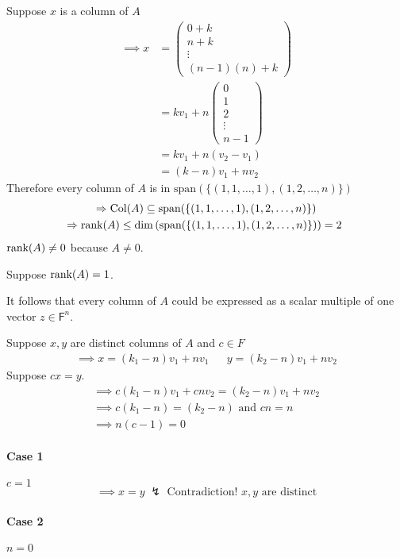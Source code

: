 Suppose $x$ is a column of $A$
\begin{align}
\implies x &= \begin{pmatrix}
0 + k\\
n + k\\
\vdots\\
(n-1)(n)+k
\end{pmatrix}\\
&= kv_1 + n\begin{pmatrix}
0\\
1\\
2\\
\vdots\\
n-1
\end{pmatrix}\\
&= kv_1 + n(v_2-v_1)\\
&= (k-n)v_1 + nv_2
\end{align}
Therefore every column of $A$ is in
$\text{span}(\{(1,1,\dotsc,1),(1,2,\dotsc,n)\})$ 
\begin{gather}
\Rightarrow \text{Col}(A) \subseteq
\text{span}(\{(1,1,\dotsc,1),(1,2,\dotsc,n)\})\\
\Rightarrow \text{rank}({A}) \leq
\dim{\left(\text{span}(\{(1,1,\dotsc,1),(1,2,\dotsc,n)\})\right)}=2\
\end{gather}
$\text{rank}({A})\neq 0$ because $A\neq 0$.

Suppose $\text{rank}({A})=1$.

It follows that every column of $A$ could be expressed as a scalar
multiple of one vector $z \in \mathsf{F}^n.$

Suppose $x,y$ are distinct columns of $A$ and $c \in F$  
\begin{align}
\implies x = (k_1 -n)v_1 + nv_1 & & y = (k_2 -n)v_1 + nv_2
\end{align}
Suppose $cx= y$.
\begin{gather}
\implies c(k_1-n)v_1 + cnv_2  = (k_2 -n)v_1 + nv_2\\
\implies c(k_1-n) = (k_2 - n) \text{ and } cn =n\\
\implies n(c-1) = 0
\end{gather}
\paragraph{Case 1} $c=1$
\begin{equation}
\implies x = y \;\lightning \text{ Contradiction! } x,y \text{ are distinct}
\end{equation}
\paragraph{Case 2} $n=0$

